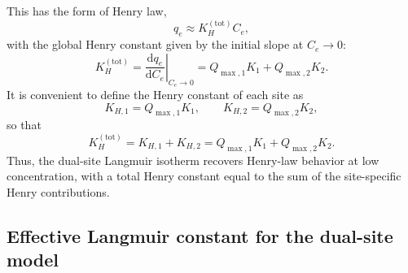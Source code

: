 	This has the form of Henry law,
	\begin{equation}
		q_e \approx K_H^{\mathrm{(tot)}} C_e,
	\end{equation}
	with the global Henry constant given by the initial slope at
	\(C_e \to 0\):
	\begin{equation}
		K_H^{\mathrm{(tot)}}
		= \left.\frac{\mathrm{d} q_e}{\mathrm{d} C_e}\right|_{C_e \to 0}
		= Q_{\max,1} K_1 + Q_{\max,2} K_2.
	\end{equation}
	It is convenient to define the Henry constant of each site as
	\begin{equation}
		K_{H,1} = Q_{\max,1} K_1,
		\qquad
		K_{H,2} = Q_{\max,2} K_2,
	\end{equation}
	so that
	\begin{equation}
		\boxed{K_H^{\mathrm{(tot)}} = K_{H,1} + K_{H,2}
			= Q_{\max,1} K_1 + Q_{\max,2} K_2.}
	\end{equation}
	Thus, the dual-site Langmuir isotherm recovers Henry-law behavior at
	low concentration, with a total Henry constant equal to the sum of
	the site-specific Henry contributions.
	
	\subsection{Effective Langmuir constant for the dual-site model}
	
